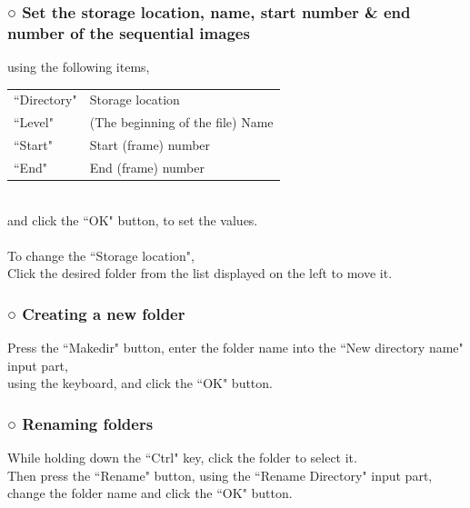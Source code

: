 \documentclass[a4paper,10pt]{article}
\begin{document}
\subsubsection*{○ Set the storage location, name, start number \& end number of the sequential images}

\noindent using the following items,\\[-1.25em]

\setlength{\tabcolsep}{0em}
\renewcommand{\arraystretch}{1.0}
\begin{tabular}{p{8.5em}l}
“Directory" & Storage location\\
“Level" & (The beginning of the file) Name\\
“Start" & Start (frame) number\\
“End" & End (frame) number\\
\end{tabular}\\[-0.5em]

\noindent and click the “OK" button, to set the values.\\
\\
To change the “Storage location",\\
Click the desired folder from the list displayed on the left to move it.\\

\subsubsection*{○ Creating a new folder}

\noindent Press the “Makedir" button, enter the folder name into the “New directory name" input part,\\
using the keyboard, and click the “OK" button.

\newpage

\noindent\vspace{0.5em}

\subsubsection*{○ Renaming folders}

\noindent While holding down the “Ctrl" key, click the folder to select it.\\
Then press the “Rename" button, using the “Rename Directory" input part,\\
change the folder name and click the “OK" button.\\
\end{document}
